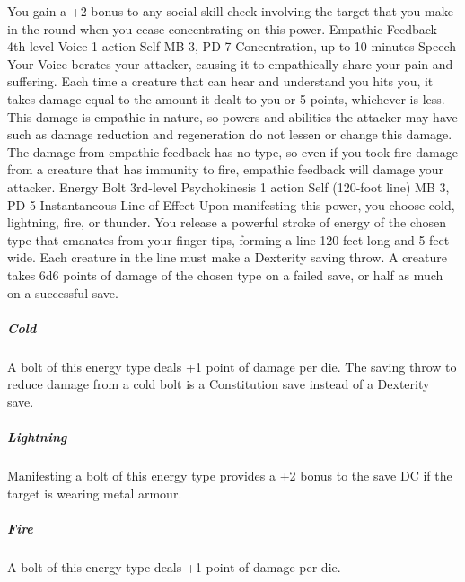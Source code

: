 You gain a +2 bonus to any social skill check involving the
target that you make in the round when you cease concentrating
on this power.
\DndPowerHeader%
    {Empathic Feedback\label{pwr:empathic-feedback}}
    {4th-level Voice}
    {1 action}
    {Self}
    {MB 3, PD 7}
    {Concentration, up to 10 minutes}
    {Speech}
Your Voice berates your attacker, causing
it to empathically share your pain and suffering. Each time
a creature that can hear and understand you hits you,
it takes damage equal to the amount it
dealt to you or 5 points, whichever is less. This damage is
empathic in nature, so powers and abilities the attacker may
have such as damage reduction and regeneration do not lessen
or change this damage. The damage from empathic feedback has
no type, so even if you took fire damage from a creature that
has immunity to fire, empathic feedback will damage your attacker.
\DndPowerHeader%
    {Energy Bolt\label{pwr:energy-bolt}}
    {3rd-level Psychokinesis}
    {1 action}
    {Self (120-foot line)}
    {MB 3, PD 5}
    {Instantaneous}
    {Line of Effect}
Upon manifesting this power, you choose cold,
lightning, fire, or thunder. You release a powerful stroke
of energy of the chosen type that emanates from your finger
tips, forming a line 120 feet long and 5 feet wide. Each creature
in the line must make a Dexterity saving throw. A creature
takes 6d6 points of damage of the chosen type on a failed
save, or half as much on a successful save.

\subparagraph{Cold} A bolt of this energy type deals +1 point
of damage per die. The saving throw to reduce damage from
a cold bolt is a Constitution save instead of a Dexterity
save.

\subparagraph{Lightning} Manifesting a bolt of this energy
type provides a +2 bonus to the save DC if the target is wearing
metal armour.

\subparagraph{Fire} A bolt of this energy type deals +1 point
of damage per die.

